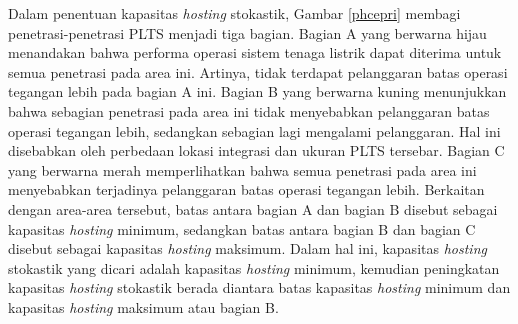 {{Dalam penentuan kapasitas \textit{hosting} stokastik, Gambar \ref{phcepri} membagi penetrasi-penetrasi PLTS menjadi tiga bagian. Bagian A yang berwarna hijau menandakan bahwa performa operasi sistem tenaga listrik dapat diterima untuk semua penetrasi pada area ini. Artinya, tidak terdapat pelanggaran batas operasi tegangan lebih pada bagian A ini. Bagian B yang berwarna kuning menunjukkan bahwa sebagian penetrasi pada area ini tidak menyebabkan pelanggaran batas operasi tegangan lebih, sedangkan sebagian lagi mengalami pelanggaran. Hal ini disebabkan oleh perbedaan lokasi integrasi dan ukuran PLTS tersebar. Bagian C yang berwarna merah memperlihatkan bahwa semua penetrasi pada area ini menyebabkan terjadinya pelanggaran batas operasi tegangan lebih. Berkaitan dengan area-area tersebut, batas antara bagian A dan bagian B disebut sebagai kapasitas \textit{hosting} minimum, sedangkan batas antara bagian B dan bagian C disebut sebagai kapasitas \textit{hosting} maksimum. Dalam hal ini, kapasitas \textit{hosting} stokastik yang dicari adalah kapasitas \textit{hosting} minimum, kemudian peningkatan kapasitas \textit{hosting} stokastik berada diantara batas kapasitas \textit{hosting} minimum dan kapasitas \textit{hosting} maksimum atau bagian B.

}}
